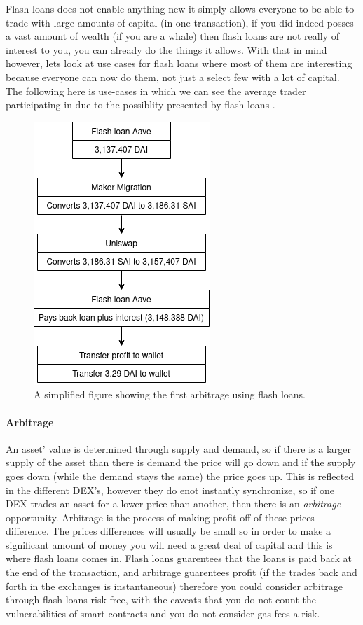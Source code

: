Flash loans does not enable anything new it simply allows everyone to
be able to trade with large amounts of capital (in one transaction),
if you did indeed posses a vast amount of wealth (if you are a whale)
then flash loans are not really of interest to you, you can already do
the things it allows. With that in mind however, lets look at use
cases for flash loans where most of them are interesting because
everyone can now do them, not just a select few with a lot of
capital. The following here is use-cases in which we can see the
average trader participating in due to the possiblity presented by
flash loans \cite{attack}.

\begin{figure}
  \centering
  \includegraphics[width=.2\textwidth]{assests/Flash-loans-18-jan}
  \caption{A simplified figure showing the first arbitrage using flash loans.}
  \label{fig:firstArb}
\end{figure}
\paragraph{Arbitrage} An asset' value is determined through supply and
demand, so if there is a larger supply of the asset than there is
demand the price will go down and if the supply goes down (while the
demand stays the same) the price goes up. This is reflected in the
different DEX's, however they do enot instantly synchronize, so if one
DEX trades an asset for a lower price than another, then there is an
\textit{arbitrage} opportunity. Arbitrage is the process of making
profit off of these prices difference. The prices differences will
usually be small so in order to make a significant amount of money you
will need a great deal of capital and this is where flash loans comes
in. Flash loans guarentees that the loans is paid back at the end of
the transaction, and arbitrage guarentees profit (if the trades back
and forth in the exchanges is instantaneous) therefore you could
consider arbitrage through flash loans risk-free, with the caveats
that you do not count the vulnerabilities of smart contracts and you
do not consider gas-fees a risk.

